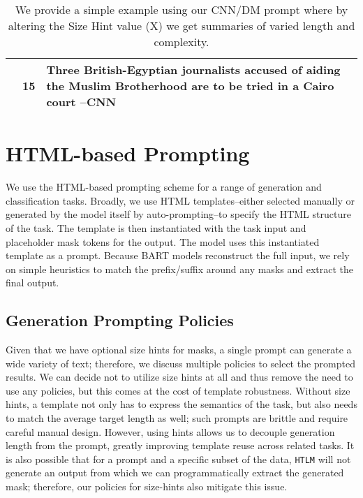 \documentclass[11pt,a4paper]{article}
\newcommand{\HTLM}{\texttt{HTLM}}
\begin{document}
\begin{table*}[!htpb]
\begin{tabular}{p{8.3cm}p{2.0cm}p{4.6cm}}
       & \vspace{-11em} 15 & \vspace{-11em} Three British-Egyptian journalists accused of aiding the Muslim Brotherhood are to be tried in a Cairo court --CNN \\ [-5em] \bottomrule
\end{tabular}
\caption{We provide a simple example using our CNN/DM prompt where by altering the Size Hint value (X) we get summaries of varied length and complexity. }
\label{table:size_hint_sample}
\end{table*}

\section{HTML-based Prompting}
We use the HTML-based prompting scheme for a range of generation and classification tasks. Broadly, we use HTML templates--either selected manually or generated by the model itself by auto-prompting--to specify the HTML structure of the task. The template is then instantiated with the task input and placeholder mask tokens for the output. The model uses this instantiated template as a prompt.
Because BART models reconstruct the full input, we rely on simple heuristics to match the prefix/suffix around any masks and extract the final output.

\subsection{Generation Prompting Policies}
Given that we have optional size hints for masks, a single prompt can generate a wide variety of text; therefore, we discuss multiple policies to select the prompted results. We can decide not to utilize size hints at all and thus remove the need to use any policies, but this comes at the cost of template robustness. Without size hints, a template not only has to express the semantics of the task, but also needs to match the average target length as well; such prompts are brittle and require careful manual design. However, using hints allows us to decouple generation length from the prompt, greatly improving template reuse across related tasks. It is also possible that for a prompt and a specific subset of the data, \HTLM{} will not generate an output from which we can programmatically extract the generated mask; therefore, our policies for size-hints also mitigate this issue.
\end{document}
